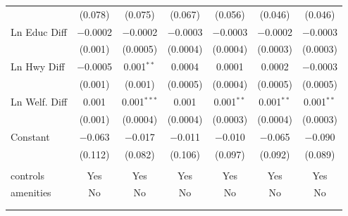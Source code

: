 \begin{table}[!htbp]
\begin{tabular}{@{\extracolsep{5pt}}lcccccc}
  & (0.078) & (0.075) & (0.067) & (0.056) & (0.046) & (0.046) \\ 
  Ln Educ Diff & $-$0.0002 & $-$0.0002 & $-$0.0003 & $-$0.0003 & $-$0.0002 & $-$0.0003 \\ 
  & (0.001) & (0.0005) & (0.0004) & (0.0004) & (0.0003) & (0.0003) \\ 
  Ln Hwy Diff & $-$0.0005 & 0.001$^{**}$ & 0.0004 & 0.0001 & 0.0002 & $-$0.0003 \\ 
  & (0.001) & (0.001) & (0.0005) & (0.0004) & (0.0005) & (0.0005) \\ 
  Ln Welf. Diff & 0.001 & 0.001$^{***}$ & 0.001 & 0.001$^{**}$ & 0.001$^{**}$ & 0.001$^{**}$ \\ 
  & (0.001) & (0.0004) & (0.0004) & (0.0003) & (0.0004) & (0.0003) \\ 
  Constant & $-$0.063 & $-$0.017 & $-$0.011 & $-$0.010 & $-$0.065 & $-$0.090 \\ 
  & (0.112) & (0.082) & (0.106) & (0.097) & (0.092) & (0.089) \\ 
 \hline \\[-1.8ex] 
controls & Yes & Yes & Yes & Yes & Yes & Yes \\ 
amenities & No & No & No & No & No & No \\ 
\hline \\[-1.8ex] 
\hline 
\hline \\[-1.8ex] 
\end{tabular} 
\end{table} 
